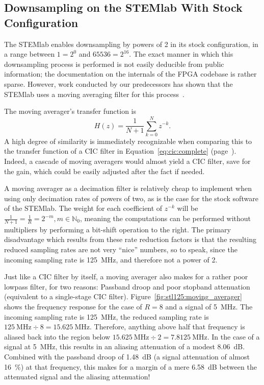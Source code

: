 \subsection{Downsampling on the STEMlab With Stock Configuration} %
\label{subsec:stl125:ds_default}

The  STEMlab  enables   downsampling  by  powers  of  \num{2}   in  its  stock
configuration, in a range  between $1 = 2^0$ and $65536  = 2^{16}$.  The exact
manner in which this downsampling process is performed is not easily deducible
from  public information;  the  documentation  on the  internals  of the  FPGA
codebase  is  rather  sparse. However,  work  conducted  by  our  predecessors
has  shown  that  the  STEMlab  uses   a  moving  averaging  filter  for  this
process~\cite{bucher:kuery}.

The moving averager's transfer function is
\begin{equation}
    \label{eq:moving_averager}
    H(z) = \frac{1}{N+1}\sum_{k = 0}^{N} z^{-k}.
\end{equation}
A high degree of similarity is immediately recognizable when comparing this to
the  transfer  function  of  a CIC  filter  in  Equation~\ref{eq:cic:complete}
(page~\pageref{eq:cic:complete}). Indeed, a cascade  of moving averagers would
almost yield a CIC  filter, save for the gain, which  could be easily adjusted
after the fact if needed.

A moving averager as a decimation filter is relatively cheap to implement when
using only  decimation rates of powers  of two, as  is the case for  the stock
software of the  STEMlab. The weight for each coefficient of  $z^{-k}$ will be
$\frac{1}{N+1}  =  \frac{1}{R} =  2^{-m},  m  \in \mathbb{N}_0$,  meaning  the
computations can  be performed without  multipliers by performing  a bit-shift
operation to the right. The primary disadvantage which results from these rate
reduction  factors  is that  the  resulting  reduced  sampling rates  are  not
very  ``nice'' numbers,  so  to speak,  since the  incoming  sampling rate  is
\SI{125}{\MHz}, and therefore not a power of \num{2}.

Just  like  a  CIC  filter  by  itself,  a  moving  averager  also  makes  for
a  rather   poor  lowpass   filter,  for   two  reasons: Passband   droop  and
poor  stopband   attenuation  (equivalent  to  a   single-stage  CIC  filter).
Figure~\ref{fig:stl125:moving_averager} shows  the frequency response  for the
case of  $R=8$ and  a signal  of \SI{5}{\MHz}. The  incoming sampling  rate is
\SI{125}{\MHz},  the  reduced  sampling  rate  is  $\SI{125}{\MHz}  \div  8  =
\SI{15.625}{\MHz}$. Therefore, anything  above half that frequency  is aliased
back into the region below $\SI{15.625}{\MHz} \div 2 = \SI{7.8125}{\MHz}$.  In
the case of a signal at  \SI{5}{\MHz}, this results in an aliasing attenuation
of a modest \SI{8.06}{\dB}. Combined with the passband droop of \SI{1.48}{\dB}
(a signal  attenuation of  almost \SI{16}{\percent})  at that  frequency, this
makes for a margin of a  mere \SI{6.58}{\dB} between the attenuated signal and
the aliasing attenuation!


